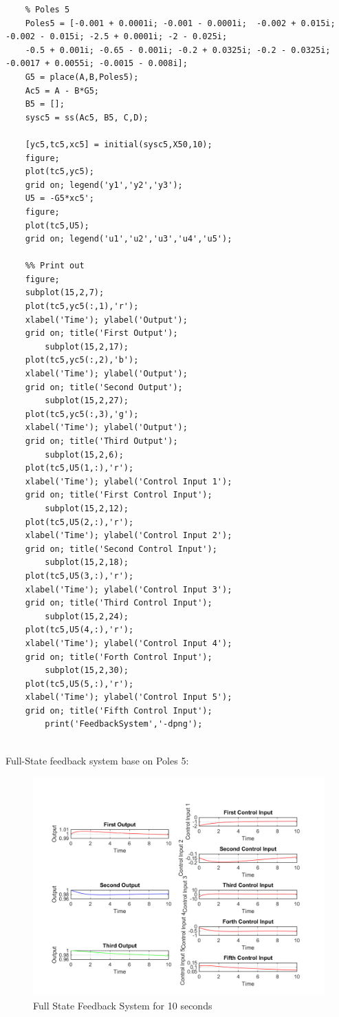 \documentclass[14pt,a4paper]{article}
\begin{document}
\begin{lstlisting}
	% Poles 5
	Poles5 = [-0.001 + 0.0001i; -0.001 - 0.0001i;  -0.002 + 0.015i; -0.002 - 0.015i; -2.5 + 0.0001i; -2 - 0.025i;
	-0.5 + 0.001i; -0.65 - 0.001i; -0.2 + 0.0325i; -0.2 - 0.0325i; -0.0017 + 0.0055i; -0.0015 - 0.008i];
	G5 = place(A,B,Poles5);
	Ac5 = A - B*G5;
	B5 = [];
	sysc5 = ss(Ac5, B5, C,D);
	
	[yc5,tc5,xc5] = initial(sysc5,X50,10);
	figure;
	plot(tc5,yc5);
	grid on; legend('y1','y2','y3');
	U5 = -G5*xc5';
	figure;
	plot(tc5,U5);
	grid on; legend('u1','u2','u3','u4','u5');
	
	%% Print out
	figure;
	subplot(15,2,7);
	plot(tc5,yc5(:,1),'r');
	xlabel('Time'); ylabel('Output');
	grid on; title('First Output');
		subplot(15,2,17);
	plot(tc5,yc5(:,2),'b');
	xlabel('Time'); ylabel('Output');
	grid on; title('Second Output');
		subplot(15,2,27);
	plot(tc5,yc5(:,3),'g');
	xlabel('Time'); ylabel('Output');
	grid on; title('Third Output');
		subplot(15,2,6);
	plot(tc5,U5(1,:),'r');
	xlabel('Time'); ylabel('Control Input 1');
	grid on; title('First Control Input');
		subplot(15,2,12);
	plot(tc5,U5(2,:),'r');
	xlabel('Time'); ylabel('Control Input 2');
	grid on; title('Second Control Input');
		subplot(15,2,18);
	plot(tc5,U5(3,:),'r');
	xlabel('Time'); ylabel('Control Input 3');
	grid on; title('Third Control Input');
		subplot(15,2,24);
	plot(tc5,U5(4,:),'r');
	xlabel('Time'); ylabel('Control Input 4');
	grid on; title('Forth Control Input');
		subplot(15,2,30);
	plot(tc5,U5(5,:),'r');
	xlabel('Time'); ylabel('Control Input 5');
	grid on; title('Fifth Control Input');
		print('FeedbackSystem','-dpng');
	
	\end{lstlisting}
	Full-State feedback system base on Poles 5:
	\begin{figure}[htp]
		\begin{center}
			\includegraphics[scale = 0.8]{FeedbackSystem.png}
		\end{center}
		\caption{Full State Feedback System for 10 seconds}
	\end{figure}
\end{document}
